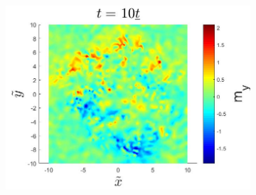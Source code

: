 \begin{figure}[h!]
\begin{subfigure}{.3\textwidth}
  \includegraphics[width=\linewidth]{Figures/StaticSkyrmionMyT10.jpg}
  \caption{}
  \label{fig:StaticSkyrmionMyT10}
\end{subfigure}


\end{figure}
